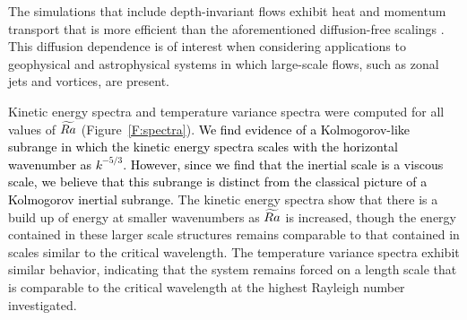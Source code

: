 The simulations that include depth-invariant flows exhibit heat and momentum transport that is more efficient than the aforementioned diffusion-free scalings \citep{sM21}. This diffusion dependence is of interest when considering  applications to geophysical and astrophysical systems in which large-scale flows, such as zonal jets and vortices, are present. 

%




Kinetic energy spectra and temperature variance spectra were computed for all values of $\widetilde{Ra}$ (Figure~\ref{F:spectra}). 
\textcolor{black}{
We find evidence of a Kolmogorov-like subrange in which the kinetic energy spectra scales with the horizontal wavenumber as $k^{-5/3}.$ }
\textcolor{black}{ However, since we find that the inertial scale is a viscous scale, we believe that this subrange is distinct from the classical picture of a Kolmogorov inertial subrange.}
The kinetic energy spectra show that there is a build up of energy at smaller wavenumbers as $\widetilde{Ra}$ is increased, though the energy contained in these larger scale structures remains comparable to that contained in scales similar to the critical wavelength. The temperature variance spectra exhibit similar behavior, indicating that the system remains forced on a length scale that is comparable to the critical wavelength at the highest Rayleigh number investigated.


